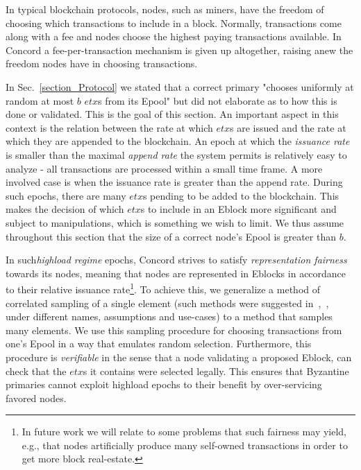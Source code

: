 In typical blockchain protocols, nodes, such as miners, have the freedom of choosing which transactions to include in a block. Normally, transactions come along with a fee and nodes choose the highest paying transactions available. 
In Concord a fee-per-transaction mechanism is given up altogether, 
raising anew the freedom nodes have in choosing transactions.

In Sec.~\ref{section_Protocol} we stated that a correct primary "chooses uniformly at random at most $b$ $etx$s from its Epool" but did not elaborate as to how this is done or validated. This is the goal of this section. An important aspect in this context is the relation between the rate at which $etx$s are issued and the rate at which they are appended to the blockchain. An epoch at which the \emph{issuance rate} is smaller than the maximal \emph{append rate} the system permits is relatively easy to analyze - all transactions are processed within a small time frame. A more involved case is when the issuance rate is greater than the append rate. During such epochs, there are many $etx$s pending to be added to the blockchain. This makes the decision of which $etx$s to include in an Eblock more significant and subject to manipulations, which is something we wish to limit. We thus assume throughout this section that the size of a correct node's Epool is greater than $b$. 

In such\emph{highload regime} epochs, Concord strives to satisfy \emph{representation fairness} towards its nodes, meaning that nodes are represented in Eblocks in accordance to their relative issuance rate\footnote{In future work we will relate to some problems that such fairness may yield, e.g., that nodes artificially produce many self-owned transactions in order to get more block real-estate.}. To achieve this, we generalize a method of correlated sampling of a single element (such methods were suggested in~\cite{HashSample1},~\cite{HashSample2},~\cite{HashSample3} under different names, assumptions and use-cases) to a method that samples many elements. We use this sampling procedure for choosing transactions from one's Epool in a way that emulates random selection. Furthermore, this procedure is \emph{verifiable} in the sense that a node validating a proposed Eblock, can check that the $etx$s it contains were selected legally. This ensures that Byzantine primaries cannot exploit highload epochs to their benefit by over-servicing favored nodes. 

